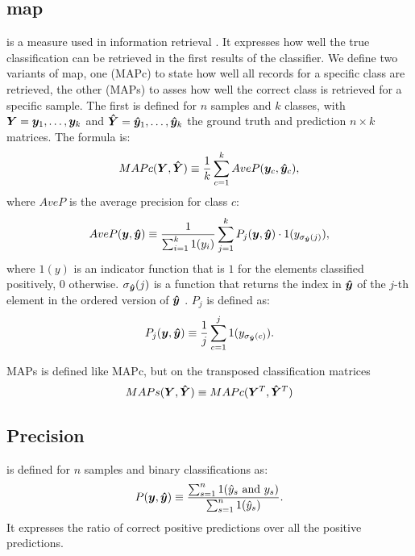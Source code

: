 \subsection{\acf{map}} is a measure used in information
retrieval \cite{manning_introduction_2008}. It expresses how well the
true classification can be retrieved in 
the first results of the classifier. We define two variants of
\ac{map}, one (MAPc) to state how well all records for a specific class are
retrieved, the other (MAPs) to asses how well the correct class is retrieved
for a specific sample. The first is defined for $n$ samples and $k$ classes,
with $\bm{Y}=\bm{y}_1,\dots,\bm{y}_k$ and $\bm{\hat
  Y}=\bm{\hat y}_1,\dots,\bm{\hat y}_k$ the ground truth and
prediction $n\times k$ matrices. The formula is:
\begin{equation*}
  MAPc(\bm{Y}, \bm{\hat Y})\equiv
  \frac{1}{k}\sum_{c=1}^{k}AveP(\bm{y}_c, \bm{\hat y}_c),
\end{equation*}
where $AveP$ is the average precision for class $c$:
\begin{equation*}
  AveP(\bm{y}, \bm{\hat y}) \equiv
  \frac{1}{\sum_{i=1}^k 1(y_i)}\sum_{j=1}^k P_j(\bm{y}, \bm{\hat y})\cdot 1(y_{\sigma_{\bm{\hat y}}(j)}),
\end{equation*}
where $1(y)$ is an indicator
function that is $1$ for the elements classified positively, $0$
otherwise. $\sigma_{\bm{\hat y}}(j)$ is a function that returns the
  index in $\bm{\hat y}$ of the $j$-th element in the ordered
  version of $\bm{\hat y}$ . $P_j$ is defined as:
\begin{equation*}
P_j(\bm{y}, \bm{\hat y}) \equiv \frac{1}{j}\sum_{c=1}^j
1(y_{\sigma_{\bm{\hat y}}(c)}).
\end{equation*}

MAPs is defined like MAPc, but on the transposed classification
matrices
\begin{equation*}
  MAPs(\bm{Y}, \bm{\hat Y})\equiv
  MAPc(\bm{Y}^T, \bm{\hat Y}^T)
\end{equation*}

\subsection{Precision} is defined for $n$ samples and binary
classifications as:
\begin{equation}\label{eq:precision}
P(\bm{y}, \bm{\hat y}) \equiv \frac{\sum_{s=1}^n 1(\hat
  y_s \text{ and }y_s)}{\sum_{s=1}^n 1(\hat y_s)}.
\end{equation}
It expresses the ratio of correct positive predictions over all the
positive predictions.


